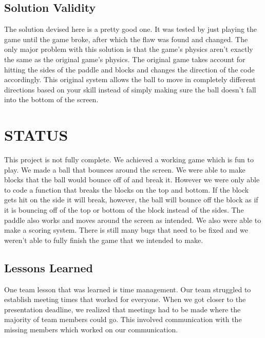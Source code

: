\documentclass[12pt]{article}
\begin{document}
\subsection{Solution Validity}
The solution devised here is a pretty good one. It was tested by just playing the game until the game broke, after which the flaw was found and changed. The only major problem with this solution is that the game's physics aren't exactly the same as the original game's physics. The original game takes account for hitting the sides of the paddle and blocks and changes the direction of the code accordingly. This original system allows the ball to move in completely different directions based on your skill instead of simply making sure the ball doesn't fall into the bottom of the screen.

\section{STATUS}

This project is not fully complete. We achieved a working game which is fun to play. We made a ball that bounces around the screen. We were able to make blocks that the ball would bounce off of and break it. However we were only able to code a function that breaks the blocks on the top and bottom. If the block gets hit on the side it will break, however, the ball will bounce off the block as if it is bouncing off of the top or bottom of the block instead of the sides. The paddle also works and moves around the screen as intended. We also were able to make a scoring system.  There is still many bugs that need to be fixed and we weren't able to fully finish the game that we intended to make.

\subsection{Lessons Learned}

One team lesson that was learned is time management. Our team struggled to establish meeting times that worked for everyone. When we got closer to the presentation deadline, we realized that meetings had to be made where the majority of team members could go. This involved communication with the missing members which worked on our communication.
\end{document}

